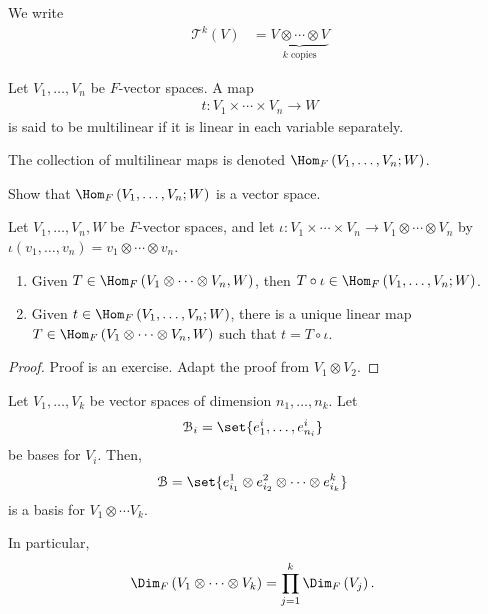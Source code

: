 \documentclass[10pt]{mypackage}
\begin{document}
  We write
  \begin{align*}
    \mathcal{T}^{k}\left(V\right) &= \underbrace{V\otimes \cdots \otimes V}_{\text{$k$ copies}}
  \end{align*}
  \begin{definition}
    Let $V_1,\dots,V_n$ be $F$-vector spaces. A map
    \begin{align*}
      t: V_1\times\cdots\times V_n\rightarrow W
    \end{align*}
    is said to be multilinear if it is linear in each variable separately.\newline

    The collection of multilinear maps is denoted $\Hom_{F}\left(V_1,\dots,V_n;W\right)$.
  \end{definition}
  \begin{exercise}
    Show that $\Hom_{F}\left(V_1,\dots,V_n;W\right)$ is a vector space.
  \end{exercise}
  \begin{theorem}
    Let $V_1,\dots,V_n,W$ be $F$-vector spaces, and let $\iota: V_1\times\cdots\times V_n\rightarrow V_1\otimes \cdots \otimes V_n$ by $\iota\left(v_1,\dots,v_n\right) = v_1\otimes\cdots\otimes v_n$.
    \begin{enumerate}[(1)]
      \item Given $T\in \Hom_{F}\left(V_1\otimes\cdots\otimes V_n,W\right)$, then $T\circ \iota \in \Hom_{F}\left(V_1,\dots,V_n;W\right)$.
      \item Given $t\in \Hom_{F}\left(V_1,\dots,V_n;W\right)$, there is a unique linear map $T\in \Hom_{F}\left(V_1\otimes\cdots\otimes V_n,W\right)$ such that $t = T\circ \iota$.
    \end{enumerate}
  \end{theorem}
  \begin{proof}
    Proof is an exercise. Adapt the proof from $V_1\otimes V_2$.
  \end{proof}
  \begin{corollary}
    Let $V_1,\dots,V_k$ be vector spaces of dimension $n_1,\dots,n_k$. Let
    \begin{align*}
      \mathcal{B}_i &= \set{e_{1}^{i},\dots,e_{n_i}^{i}}
    \end{align*}
    be bases for $V_i$. Then,
    \begin{align*}
      \mathcal{B} &= \set{e_{i_1}^{1}\otimes e_{i_2}^{2}\otimes\cdots\otimes e_{i_k}^{k}}
    \end{align*}
    is a basis for $V_1\otimes\cdots V_k$.\newline

    In particular,
    \begin{align*}
      \Dim_{F}\left(V_1\otimes\cdots\otimes V_k\right) &= \prod_{j=1}^{k}\Dim_{F}\left(V_j\right).
    \end{align*}
    
  \end{corollary}
\end{document}
